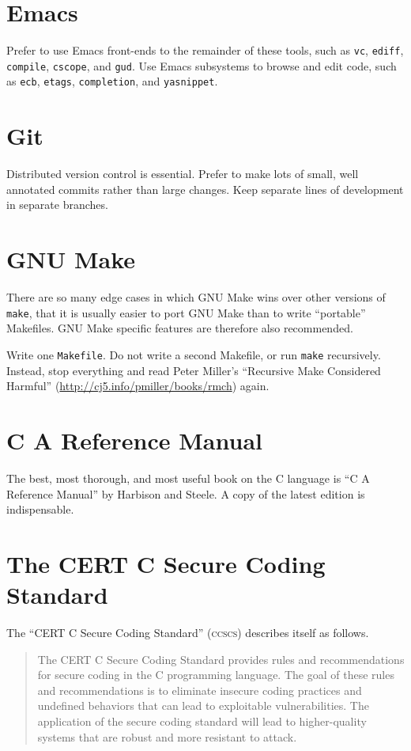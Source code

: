 \documentclass{lulu}
\newcommand{\code}[1]{\texttt{#1}\xspace}
\begin{document}
\section{Emacs}

Prefer to use Emacs front-ends to the remainder of these tools, such
as \code{vc}, \code{ediff}, \code{compile}, \code{cscope}, and
\code{gud}.  Use Emacs subsystems to browse and edit code, such as
\code{ecb}, \code{etags}, \code{completion}, and \code{yasnippet}.

\section{Git}

Distributed version control is essential.  Prefer to make lots of
small, well annotated commits rather than large changes.  Keep
separate lines of development in separate branches.

\section{GNU Make}

There are so many edge cases in which GNU Make wins over other
versions of \code{make}, that it is usually easier to port GNU Make
than to write ``portable'' Makefiles.  GNU Make specific features are
therefore also recommended.

Write one \code{Makefile}.  Do not write a second Makefile, or run
\code{make} recursively.  Instead, stop everything and read Peter
Miller's ``Recursive Make Considered Harmful''
(\url{http://cj5.info/pmiller/books/rmch}) again.

\section{C A Reference Manual}

The best, most thorough, and most useful book on the C language is ``C
A Reference Manual'' by Harbison and Steele.  A copy of the latest
edition is indispensable.

\section{The CERT C Secure Coding Standard}

The ``CERT C Secure Coding Standard'' (\textsc{ccscs}) describes
itself as follows.

\begin{quote}
The CERT C Secure Coding Standard provides rules and recommendations
for secure coding in the C programming language. The goal of these
rules and recommendations is to eliminate insecure coding practices
and undefined behaviors that can lead to exploitable
vulnerabilities. The application of the secure coding standard will
lead to higher-quality systems that are robust and more resistant to
attack.
\end{quote}
\end{document}
